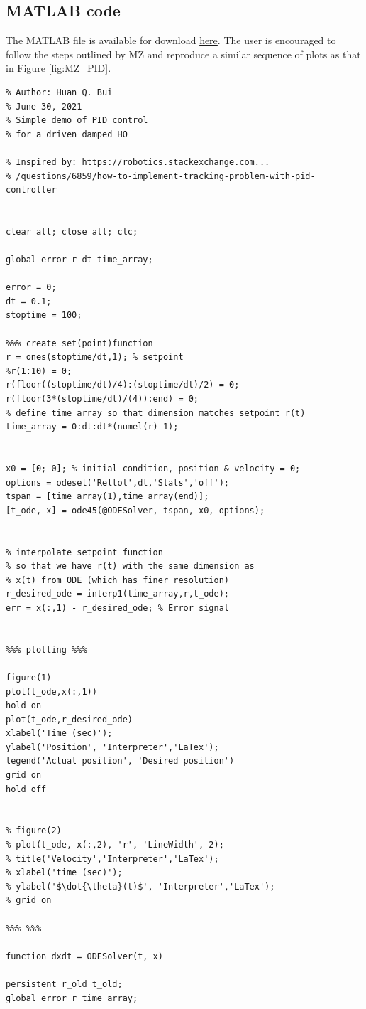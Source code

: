 \documentclass{article}
\theoremstyle{definition}
\begin{document}
\subsection{MATLAB code}

The MATLAB file is available for download \href{https://huanqbui.com/MIT PhD/BUI_AtomicPhysics/MATLAB/PID_harmonic_osc.m}{here}. The user is encouraged to follow the steps outlined by MZ and reproduce a similar sequence of plots as that in Figure \ref{fig:MZ_PID}.


\begin{lstlisting}
% Author: Huan Q. Bui
% June 30, 2021
% Simple demo of PID control 
% for a driven damped HO

% Inspired by: https://robotics.stackexchange.com...
% /questions/6859/how-to-implement-tracking-problem-with-pid-controller


clear all; close all; clc;

global error r dt time_array;

error = 0;
dt = 0.1;
stoptime = 100;

%%% create set(point)function
r = ones(stoptime/dt,1); % setpoint
%r(1:10) = 0;
r(floor((stoptime/dt)/4):(stoptime/dt)/2) = 0;
r(floor(3*(stoptime/dt)/(4)):end) = 0;
% define time array so that dimension matches setpoint r(t)
time_array = 0:dt:dt*(numel(r)-1);


x0 = [0; 0]; % initial condition, position & velocity = 0;
options = odeset('Reltol',dt,'Stats','off');
tspan = [time_array(1),time_array(end)];
[t_ode, x] = ode45(@ODESolver, tspan, x0, options);


% interpolate setpoint function 
% so that we have r(t) with the same dimension as 
% x(t) from ODE (which has finer resolution)
r_desired_ode = interp1(time_array,r,t_ode);
err = x(:,1) - r_desired_ode; % Error signal


%%% plotting %%%

figure(1)
plot(t_ode,x(:,1))
hold on 
plot(t_ode,r_desired_ode)
xlabel('Time (sec)');
ylabel('Position', 'Interpreter','LaTex');
legend('Actual position', 'Desired position')
grid on
hold off


% figure(2)
% plot(t_ode, x(:,2), 'r', 'LineWidth', 2);
% title('Velocity','Interpreter','LaTex');
% xlabel('time (sec)');
% ylabel('$\dot{\theta}(t)$', 'Interpreter','LaTex');
% grid on

%%% %%%

function dxdt = ODESolver(t, x)

persistent r_old t_old;
global error r time_array;


\end{lstlisting}
\end{document}

